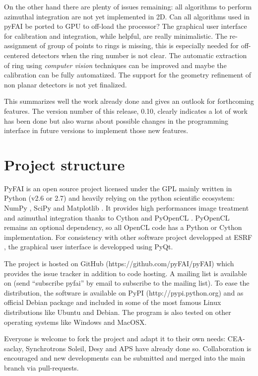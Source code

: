 \documentclass[preprint]{iucr}
\begin{document}
On the other hand there are plenty of issues remaining: all algorithms to
perform azimuthal integration are not yet implemented in 2D.
Can all algorithms used in
pyFAI be ported to GPU to off-load the processor? The graphical user interface
for calibration and integration, while helpful, are really minimalistic.
The re-assignment of group of points to rings is missing, this is
especially needed for off-centered detectors when the ring number is not clear.
The automatic extraction of ring using \textit{computer vision} techniques can
be improved and maybe the calibration can be fully automatized.
The support for the geometry refinement of non planar detectors is not yet
finalized.

This summarizes well the work already done and gives an
outlook for forthcoming features.
The version number of this release, 0.10, clearly indicates a lot of work has
been done but also warns about possible changes in the programming interface
in future versions to implement those new features.




\appendix
\section{Project structure}

PyFAI is an open source project licensed under the GPL mainly written in Python (v2.6 or 2.7)
and heavily relying on the python scientific ecosystem: NumPy \cite{numpy},
SciPy \cite{scipy} and Matplotlib \cite{matplotlib}.
It provides high performances image treatment and azimuthal integration thanks
to Cython \cite{cython} and PyOpenCL \cite{pyopencl}.
PyOpenCL remains an optional dependency, so all OpenCL code has a
Python or Cython implementation.
For consistency with other software project developped at ESRF \cite{pymca},
the graphical user interface is developped using PyQt.

The project is hosted on GitHub (https://github.com/pyFAI/pyFAI) which provides
the issue tracker in addition to code hosting. A mailing list is available on
 (send ``subscribe pyfai'' by email to subscribe to the
mailing list).
To ease the distribution, the software is available on PyPI
(http://pypi.python.org) and as official Debian package and included in some of
the most famous Linux distributions like Ubuntu and Debian.
The program is also tested on other operating systems like Windows and
MacOSX.

Everyone is welcome to fork the project and adapt it to their own needs: CEA-saclay,
Synchrotrons Soleil, Desy and APS have already done so. Collaboration is encouraged and
new developments can be submitted and merged into the main branch
via pull-requests.
\end{document}
